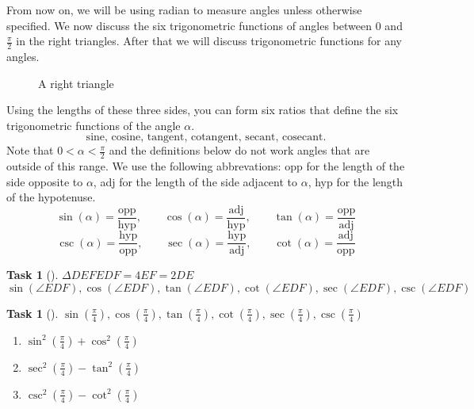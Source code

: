 \documentclass[10pt,]{article}
\theoremstyle{plain}
\newtheorem{proposition}[theorem]{Task}
\theoremstyle{definition}
\numberwithin{equation}{section}
\newcommand{\lt}{<}
\begin{document}
\hypertarget{p-119}{}%
From now on, we will be using radian to measure angles unless otherwise specified. We now discuss the six trigonometric functions of angles between \(0\) and \(\frac{\pi}{2}\) in the right triangles. After that we will discuss trigonometric functions for any angles.%
\begin{figure}
\centering
{
}
\caption{A right triangle\label{figure-3}}
\end{figure}
\hypertarget{p-120}{}%
Using the lengths of these three sides, you can form six ratios that define the six trigonometric functions of the angle \(\alpha\).%
\begin{equation*}
\text{sine, cosine, tangent, cotangent, secant, cosecant.}
\end{equation*}
Note that \(0 \lt \alpha \lt \frac{\pi}{2}\) and the definitions below do not work angles that are outside of this range. We use the following abbrevations: opp for the length of the side opposite to \(\alpha\), adj for the length of the side adjacent to \(\alpha\), hyp for the length of the hypotenuse.%
\begin{equation*}
\sin(\alpha) = \frac{\text{opp}}{\text{hyp}}, \qquad \cos(\alpha) = \frac{\text{adj}}{\text{hyp}}, \qquad \tan(\alpha) = \frac{\text{opp}}{\text{adj}}
\end{equation*}
%
\begin{equation*}
\csc(\alpha) = \frac{\text{hyp}}{\text{opp}}, \qquad \sec(\alpha) = \frac{\text{hyp}}{\text{adj}}, \qquad \cot(\alpha) = \frac{\text{adj}}{\text{opp}}
\end{equation*}
%
\begin{proposition}[{}]\label{proposition-52}
\(\Delta DEF\)\(E\)\(DF=4\)\(EF=2\)\(DE\)\(\sin(\angle EDF), \cos(\angle EDF), \tan(\angle EDF), \cot(\angle EDF), \sec(\angle EDF), \csc(\angle EDF)\)\end{proposition}
\begin{proposition}[{}]\label{problem-verifysimpletrigid}
\(\displaystyle \sin(\frac{\pi}{4}), \cos(\frac{\pi}{4}), \tan(\frac{\pi}{4}), \cot(\frac{\pi}{4}), \sec(\frac{\pi}{4}), \csc(\frac{\pi}{4})\)\leavevmode%
\begin{enumerate}
\item\hypertarget{li-259}{}\(\displaystyle \sin^2(\frac{\pi}{4}) + \cos^2(\frac{\pi}{4})\)%
\item\hypertarget{li-260}{}\(\displaystyle \sec^2(\frac{\pi}{4}) - \tan^2(\frac{\pi}{4})\)%
\item\hypertarget{li-261}{}\(\displaystyle \csc^2(\frac{\pi}{4}) - \cot^2(\frac{\pi}{4})\)%
\end{enumerate}
\end{proposition}
\end{document}
